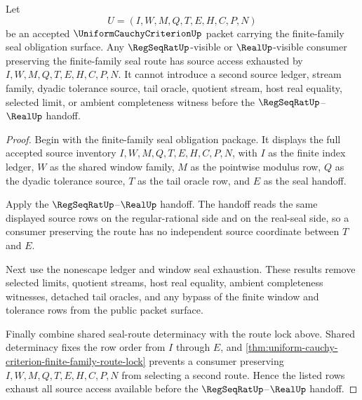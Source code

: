 \begin{theorem}
\label{thm:uniform-cauchy-criterion-finite-family-source-exhaustion}
Let
$$
U=(I,W,M,Q,T,E,H,C,P,N)
$$
be an accepted $\UniformCauchyCriterionUp$ packet carrying the finite-family
seal obligation surface. Any $\RegSeqRatUp$-visible or $\RealUp$-visible
consumer preserving the finite-family seal route has source access exhausted
by $I,W,M,Q,T,E,H,C,P,N$. It cannot introduce a second source ledger, stream
family, dyadic tolerance source, tail oracle, quotient stream, host real
equality, selected limit, or ambient completeness witness before the
$\RegSeqRatUp$--$\RealUp$ handoff.
\end{theorem}
\begin{proof}
Begin with the finite-family seal obligation package. It displays the full
accepted source inventory $I,W,M,Q,T,E,H,C,P,N$, with $I$ as the finite index
ledger, $W$ as the shared window family, $M$ as the pointwise modulus row, $Q$
as the dyadic tolerance source, $T$ as the tail oracle row, and $E$ as the seal
handoff.

Apply the $\RegSeqRatUp$--$\RealUp$ handoff. The handoff reads the same
displayed source rows on the regular-rational side and on the real-seal side,
so a consumer preserving the route has no independent source coordinate
between $T$ and $E$.

Next use the nonescape ledger and window seal exhaustion. These results remove
selected limits, quotient streams, host real equality, ambient completeness
witnesses, detached tail oracles, and any bypass of the finite window and
tolerance rows from the public packet surface.

Finally combine shared seal-route determinacy with the route lock above.
Shared determinacy fixes the row order from $I$ through $E$, and
\autoref{thm:uniform-cauchy-criterion-finite-family-route-lock} prevents a
consumer preserving $I,W,M,Q,T,E,H,C,P,N$ from selecting a second route. Hence
the listed rows exhaust all source access available before the
$\RegSeqRatUp$--$\RealUp$ handoff.
\end{proof}

